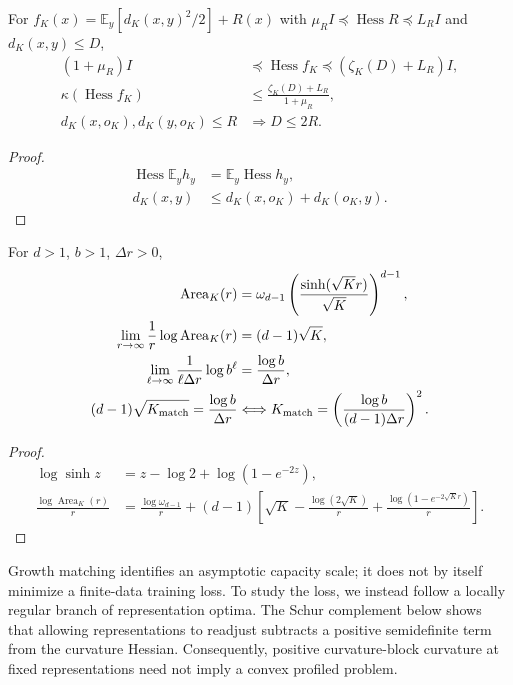\begin{corollary}
For $f_K(x)=\mathbb E_y[d_K(x,y)^2/2]+R(x)$ with
$\mu_RI\preceq\operatorname{Hess}R\preceq L_RI$ and
$d_K(x,y)\le D$,
\begin{align}
 (1+\mu_R)I&\preceq\operatorname{Hess}f_K
 \preceq(\zeta_K(D)+L_R)I,\\
 \kappa(\operatorname{Hess}f_K)
 &\le\frac{\zeta_K(D)+L_R}{1+\mu_R},\\
 d_K(x,o_K),d_K(y,o_K)\le R&\Longrightarrow D\le2R.
\end{align}
\end{corollary}
\begin{proof}
\begin{align}
 \operatorname{Hess}\mathbb E_yh_y
 &=\mathbb E_y\operatorname{Hess}h_y,\\
 d_K(x,y)&\le d_K(x,o_K)+d_K(o_K,y).
\end{align}
\end{proof}

\begin{proposition}
For $d>1$, $b>1$, $\Delta r>0$,
\begin{align}
 \operatorname{Area}_K(r)
 &=\omega_{d-1}\left(\frac{\sinh(\sqrt Kr)}{\sqrt K}\right)^{d-1},\\
 \lim_{r\to\infty}\frac1r\log\operatorname{Area}_K(r)
 &=(d-1)\sqrt K,\\
 \lim_{\ell\to\infty}\frac1{\ell\Delta r}\log b^\ell
 &=\frac{\log b}{\Delta r},\\
 (d-1)\sqrt{K_{\rm match}}=\frac{\log b}{\Delta r}
 &\Longleftrightarrow
 K_{\rm match}=\left(\frac{\log b}{(d-1)\Delta r}\right)^2.\label{eq:capacity-heuristic}
\end{align}
\end{proposition}
\begin{proof}
\begin{align}
 \log\sinh z&=z-\log2+\log(1-e^{-2z}),\\
 \frac{\log\operatorname{Area}_K(r)}r
 &=\frac{\log\omega_{d-1}}r+
 (d-1)\left[\sqrt K-\frac{\log(2\sqrt K)}r+
 \frac{\log(1-e^{-2\sqrt Kr})}r\right].
\end{align}
\end{proof}

Growth matching identifies an asymptotic capacity scale; it does not by itself minimize a finite-data training loss. To study the loss, we instead follow a locally regular branch of representation optima. The Schur complement below shows that allowing representations to readjust subtracts a positive semidefinite term from the curvature Hessian. Consequently, positive curvature-block curvature at fixed representations need not imply a convex profiled problem.

